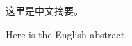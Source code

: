 \begin{cnabstract}

这里是中文摘要。


\end{cnabstract}

\begin{enabstract}

Here is the English abstract.


\end{enabstract}

